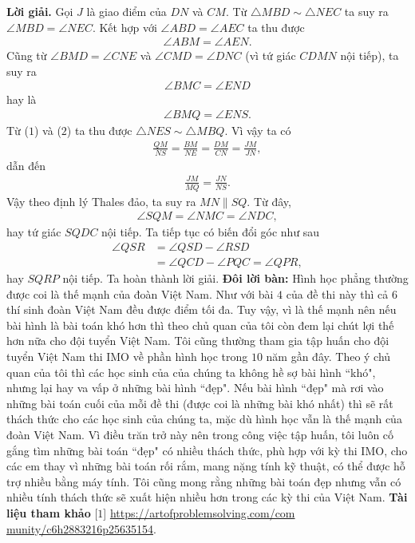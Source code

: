 \begin{multicols}{2}
	\setlength{\abovedisplayskip}{6pt}
	\setlength{\belowdisplayskip}{6pt}
	\textbf{\color{cackithi}Lời giải.} Gọi $J$ là giao điểm của $DN$ và $CM$. Từ $\triangle MBD\sim\triangle NEC$ ta suy ra $\angle MBD=\angle NEC$. Kết hợp với $\angle ABD=\angle AEC$ ta thu được 
		\begin{align*}\angle ABM=\angle AEN.\tag{$1$}\end{align*}
		Cũng từ $\angle BMD=\angle CNE$ và $\angle CMD=\angle DNC$ (vì tứ giác $CDMN$ nội tiếp), ta suy ra
		\begin{align*}
			\angle BMC=\angle END
		\end{align*} hay là 
		\begin{align*}
			\angle BMQ=\angle ENS. \tag{$2$}
		\end{align*}
		Từ ($1$) và ($2$) ta thu được $\triangle NES\sim\triangle MBQ$. Vì vậy ta có 
		\begin{align*}
			\frac{QM}{NS}=\frac{BM}{NE}=\frac{DM}{CN}=\frac{JM}{JN},
		\end{align*}
		dẫn đến
		\begin{align*}
			\frac{JM}{MQ}=\frac{JN}{NS}.
		\end{align*}
		Vậy theo định lý Thales đảo, ta suy ra \linebreak$MN\parallel SQ$. Từ đây,
		\begin{align*}
			\angle SQM=\angle NMC=\angle NDC,
		\end{align*} hay tứ giác $SQDC$ nội tiếp. Ta tiếp tục có biến đổi góc như sau
		\begin{align*}
			\angle QSR&=\angle QSD-\angle RSD\\
			&=\angle QCD-\angle PQC=\angle QPR,
		\end{align*}
		hay $SQRP$ nội tiếp. Ta hoàn thành lời giải.
	\vskip 0.05cm
	{\bf\color{cackithi}Đôi lời bàn:}
	Hình học phẳng thường được coi là thế mạnh của đoàn Việt Nam. Như với bài $4$ của đề thi này thì cả $6$ thí sinh đoàn Việt Nam đều được điểm tối đa. Tuy vậy, vì là thế mạnh nên nếu bài hình là bài toán khó hơn thì theo chủ quan của tôi còn đem lại chút lợi thế hơn nữa cho đội tuyển Việt Nam. Tôi cũng thường tham gia tập huấn cho đội tuyển Việt Nam thi IMO về phần hình học trong $10$ năm gần đây. Theo ý chủ quan của tôi thì các học sinh của của chúng ta không hề sợ bài hình ``khó", nhưng lại hay va vấp ở những bài hình ``đẹp". Nếu bài hình ``đẹp" mà rơi vào những bài toán cuối của mỗi đề thi (được coi là những bài khó nhất) thì sẽ rất thách thức cho các học sinh của chúng ta, mặc dù hình học vẫn là thế mạnh của đoàn Việt Nam. Vì điều trăn trở này nên trong công việc tập huấn, tôi luôn cố gắng tìm những bài toán ``đẹp" có nhiều thách thức, phù hợp với kỳ thi IMO, cho các em thay vì những bài toán rối rắm, mang nặng tính kỹ thuật, có thể được hỗ trợ nhiều bằng máy tính. Tôi cũng mong rằng những bài toán đẹp nhưng vẫn có nhiều tính thách thức sẽ xuất hiện nhiều hơn trong các kỳ thi của Việt Nam.
	\vskip 0.05cm
	\textbf{\color{cackithi}Tài liệu tham khảo}
	\vskip 0.05cm
	[$1$] \url{https://artofproblemsolving.com/com} \url{munity/c6h2883216p25635154}.
\end{multicols}
